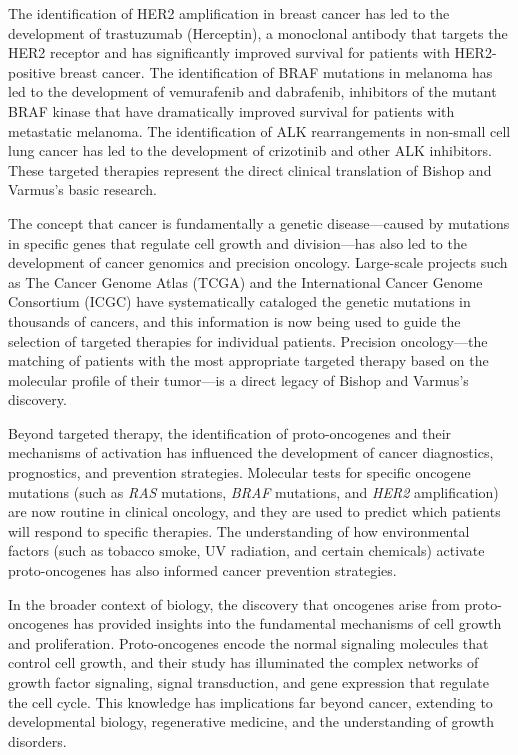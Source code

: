 The identification of HER2 amplification in breast cancer has led to the development of trastuzumab (Herceptin), a monoclonal antibody that targets the HER2 receptor and has significantly improved survival for patients with HER2-positive breast cancer. The identification of BRAF mutations in melanoma has led to the development of vemurafenib and dabrafenib, inhibitors of the mutant BRAF kinase that have dramatically improved survival for patients with metastatic melanoma. The identification of ALK rearrangements in non-small cell lung cancer has led to the development of crizotinib and other ALK inhibitors. These targeted therapies represent the direct clinical translation of Bishop and Varmus's basic research.

The concept that cancer is fundamentally a genetic disease---caused by mutations in specific genes that regulate cell growth and division---has also led to the development of cancer genomics and precision oncology. Large-scale projects such as The Cancer Genome Atlas (TCGA) and the International Cancer Genome Consortium (ICGC) have systematically cataloged the genetic mutations in thousands of cancers, and this information is now being used to guide the selection of targeted therapies for individual patients. Precision oncology---the matching of patients with the most appropriate targeted therapy based on the molecular profile of their tumor---is a direct legacy of Bishop and Varmus's discovery.

Beyond targeted therapy, the identification of proto-oncogenes and their mechanisms of activation has influenced the development of cancer diagnostics, prognostics, and prevention strategies. Molecular tests for specific oncogene mutations (such as \emph{RAS} mutations, \emph{BRAF} mutations, and \emph{HER2} amplification) are now routine in clinical oncology, and they are used to predict which patients will respond to specific therapies. The understanding of how environmental factors (such as tobacco smoke, UV radiation, and certain chemicals) activate proto-oncogenes has also informed cancer prevention strategies.

In the broader context of biology, the discovery that oncogenes arise from proto-oncogenes has provided insights into the fundamental mechanisms of cell growth and proliferation. Proto-oncogenes encode the normal signaling molecules that control cell growth, and their study has illuminated the complex networks of growth factor signaling, signal transduction, and gene expression that regulate the cell cycle. This knowledge has implications far beyond cancer, extending to developmental biology, regenerative medicine, and the understanding of growth disorders.

